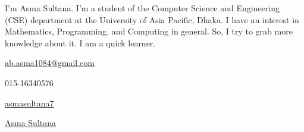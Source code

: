 \documentclass[11pt]{spidercv}
\begin{document}
    \PrintableMode

    \begin{TopBar}{\ColorTextSide}

        \SimpleSeparator{\ColorHighlight}

       I'm Asma Sultana. I'm a student of the Computer Science and Engineering (CSE) department at the University of Asia Pacific, Dhaka. I have an interest in Mathematics, Programming, and Computing in general. So, I try to grab more knowledge about it. I am a quick learner.
       
        

        \SimpleSeparator{\ColorHighlight}
        \begin{DoubleColumns}
            \begin{ItemList}{\ColorHighlight}
                \item [\Large\faAt] \href{mailto:ab.asma1084@gmail.com}{ab.asma1084@gmail.com}
                \item [\Large\faMobile] 015-16340576
            \end{ItemList}
            \nextcolumn
            \begin{ItemList}{\ColorHighlight}
                \item [\Large\faGithub] \href{https://github.com/asmasultana7}{asmasultana7}
                \item [\Large\faLinkedinSquare] \href{www.linkedin.com/in/asma-9414a9264}{Asma Sultana}
            \end{ItemList}
        \end{DoubleColumns}

    \end{TopBar}
\end{document}
